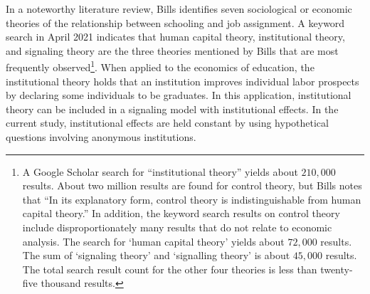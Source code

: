 % 
In a noteworthy literature review, Bills identifies seven sociological or economic theories of the relationship between schooling and job assignment\cite{bills2003credentials}.
A keyword search in April 2021 indicates that human capital theory, institutional theory, and signaling theory are the three theories mentioned by Bills that are most frequently observed\footnote{
    A Google Scholar search for ``institutional theory'' yields about $210,000$ results.
    About two million results are found for control theory, but Bills notes that ``In its explanatory form, control theory is indistinguishable from human capital theory.''
    In addition, the keyword search results on control theory include disproportionately many results that do not relate to economic analysis.
    The search for `human capital theory' yields about $72,000$ results.
    The sum of `signaling theory' and `signalling theory' is about $45,000$ results.
    The total search result count for the other four theories is less than twenty-five thousand results.
}.
When applied to the economics of education, the institutional theory holds that an institution improves individual labor prospects by declaring some individuals to be graduates.
In this application, institutional theory can be included in a signaling model with institutional effects.
In the current study, institutional effects are held constant by using hypothetical questions involving anonymous institutions.

